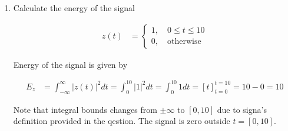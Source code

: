 \documentclass[12pt, xcolor=dvipsnames,svgnames,x11names]{article}
\begin{document}
\begin{enumerate}
\begin{tcolorbox}
$u(t-2)+u(-t)$
    
\end{tcolorbox}


\item Calculate the energy of the signal 

\begin{align*}
z(t) & = \begin{cases}
1, \quad 0 \leq t \leq 10\\
0, \quad \text{otherwise}
\end{cases}
\end{align*}

\begin{tcolorbox}[
    enhanced,breakable,
    colback=androidBlueLight!80,
    colframe=androidBlue,
    arc=5pt,
    boxrule=1pt,
    title=\textbf{Answer},
    fonttitle=\bfseries,
    coltitle=black,
    top=10pt,
    bottom=8pt,
    left=8pt,
    right=8pt,
    attach boxed title to top left={xshift=10pt, yshift=-\tcboxedtitleheight/2},
    boxed title style={
    colback=androidBlue,    
        colframe=androidBlue,
        arc=3pt,
        boxrule=0pt,
        left=6pt, right=6pt,
        top=3pt, bottom=3pt
    }
    ]


Energy of the signal is given by

\begin{align*}
E_z & = \int_{-\infty}^\infty |z(t)|^2 dt = \int_0^{10} |1|^2 dt =  \int_0^{10} 1 dt = [t]_{t=0}^{t=10} = 10-0 = 10
\end{align*}

Note that integral bounds changes from $\pm \infty $ to $[0, 10]$ due to signa's definition provided in the qestion. The signal is zero outside $t = [0, 10]$.

\end{tcolorbox}



\end{enumerate}
\end{document}
